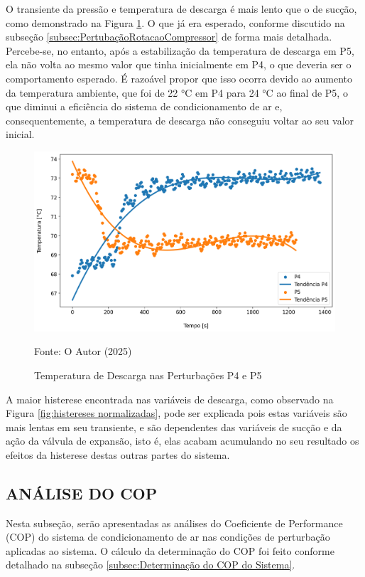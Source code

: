 O transiente da pressão e temperatura de descarga é mais lento que o de sucção, como demonstrado na Figura \ref{fig:TempDescargaSubidaeDescida}. O que já era esperado, conforme discutido na subseção \ref{subsec:PertubaçãoRotacaoCompressor} de forma mais detalhada.
Percebe-se, no entanto, após a estabilização da temperatura de descarga em P5, ela não volta ao mesmo valor que tinha inicialmente em P4, o que deveria ser o comportamento esperado. É razoável propor que isso ocorra devido ao aumento da temperatura ambiente, que foi de 22 °C em P4 para 24 °C ao final de P5, o que diminui a eficiência do sistema de condicionamento de ar e, consequentemente, a temperatura de descarga não conseguiu voltar ao seu valor inicial.
\newpage
\begin{figure}[h]
    \centering
    \includegraphics[width=1\linewidth]{FigurasdoTexto/Temperatura de Descargahyst.png}
    \caption{Temperatura de Descarga  nas Perturbações P4 e P5}
    \label{fig:TempDescargaSubidaeDescida}
    {\footnotesize Fonte: O Autor (2025)}
\end{figure}

A maior histerese encontrada nas variáveis de descarga, como observado na Figura \ref{fig:histereses normalizadas}, pode ser explicada pois estas variáveis são mais lentas em seu transiente, e são dependentes das variáveis de sucção e da ação da válvula de expansão, isto é, elas acabam acumulando no seu resultado os efeitos da histerese destas outras partes do sistema. 

\subsection{\MakeUppercase{Análise do COP}}

Nesta subseção, serão apresentadas as análises do Coeficiente de Performance (COP) do sistema de condicionamento de ar nas condições de perturbação aplicadas ao sistema. O cálculo da determinação do COP foi feito conforme detalhado na subseção \ref{subsec:Determinação do COP do Sistema}.

